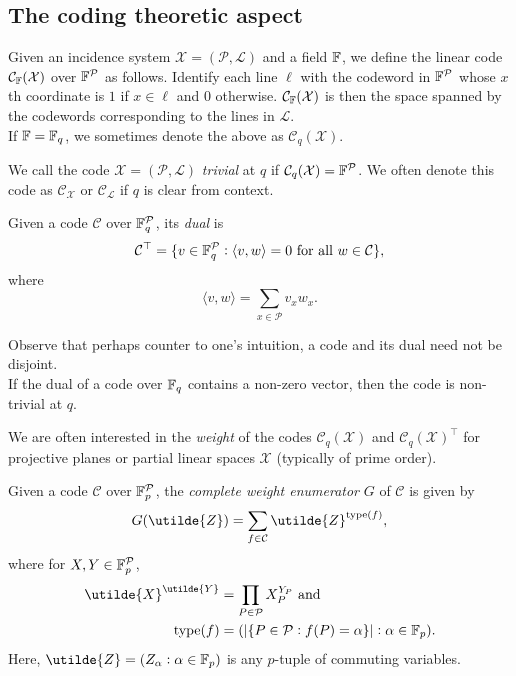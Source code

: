 \subsection{The coding theoretic aspect}

	\begin{fdef}
		Given an incidence system $\mathcal{X} = (\mathcal{P},\mathcal{L})$ and a field $\mathbb{F}$, we define the linear code $\mathcal{C}_{\mathbb{F}}(\mathcal{X})$ over $\mathbb{F}^\mathcal{P}$ as follows. Identify each line $\ell$ with the codeword in $\mathbb{F}^{\mathcal{P}}$ whose $x$th coordinate is $1$ if $x \in \ell$ and $0$ otherwise. $\mathcal{C}_{\mathbb{F}}(\mathcal{X})$ is then the space spanned by the codewords corresponding to the lines in $\mathcal{L}$.\\
		If $\mathbb{F} = \mathbb{F}_q$, we sometimes denote the above as $\mathcal{C}_q(\mathcal{X})$.
	\end{fdef}

	We call the code $\mathcal{X} = (\mathcal{P},\mathcal{L})$ \emph{trivial} at $q$ if $\mathcal{C}_q(\mathcal{X}) = \mathbb{F}^\mathcal{P}$. We often denote this code as $\mathcal{C}_\mathcal{X}$ or $\mathcal{C}_\mathcal{L}$ if $q$ is clear from context.

	\begin{fdef}[Dual]
		Given a code $\mathcal{C}$ over $\mathbb{F}_q^\mathcal{P}$, its \emph{dual} is
		\[ \mathcal{C}^\top = \{ v \in \mathbb{F}_q^\mathcal{P} : \langle v,w\rangle = 0 \text{ for all }w\in\mathcal{C} \}, \]
		where
		\[ \langle v , w \rangle = \sum_{x \in \mathcal{P}} v_x w_x.  \]
	\end{fdef}
	Observe that perhaps counter to one's intuition, a code and its dual need not be disjoint.\\
	If the dual of a code over $\mathbb{F}_q$ contains a non-zero vector, then the code is non-trivial at $q$.

	We are often interested in the \emph{weight} of the codes $\mathcal{C}_q(\mathcal{X})$ and $\mathcal{C}_q(\mathcal{X})^\top$ for projective planes or partial linear spaces $\mathcal{X}$ (typically of prime order).

	\begin{fdef}
		Given a code $\mathcal{C}$ over $\mathbb{F}_p^{\mathcal{P}}$, the \emph{complete weight enumerator} $G$ of $\mathcal{C}$ is given by
		\[ G(\utilde{Z}) = \sum_{f \in \mathcal{C}} \utilde{Z}^{\type(f)}, \]
		where for $X,Y \in \mathbb{F}_p^{\mathcal{P}}$,
		\begin{align*}
			\utilde{X}^{\utilde{Y}} &= \prod_{P \in \mathcal{P}} X_P^{Y_P} \text{ and } \\
			\type(f) &= ( |\{ P \in \mathcal{P} : f(P) = \alpha \}|  : \alpha \in \F_p ).
		\end{align*}
		Here, $\utilde{Z} = ( Z_\alpha : \alpha \in \F_p )$ is any $p$-tuple of commuting variables.
	\end{fdef}

